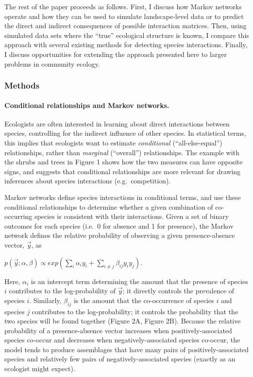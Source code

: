 \documentclass[12pt,]{article}
\begin{document}
\begin{spacing}{1.9}
\begin{flushleft}
The rest of the paper proceeds as follows. First, I discuss how Markov
networks operate and how they can be used to simulate landscape-level
data or to predict the direct and indirect consequences of possible
interaction matrices. Then, using simulated data sets where the ``true''
ecological structure is known, I compare this approach with several
existing methods for detecting species interactions. Finally, I discuss
opportunities for extending the approach presented here to larger
problems in community ecology.

\subsubsection{Methods}\label{methods}

\paragraph{Conditional relationships and Markov
networks.}\label{conditional-relationships-and-markov-networks.}

Ecologists are often interested in learning about direct interactions
between species, controlling for the indirect influence of other
species. In statistical terms, this implies that ecologists want to
estimate \emph{conditional} (``all-else-equal'') relationships, rather
than \emph{marginal} (``overall'') relationships. The example with the
shrubs and trees in Figure 1 shows how the two measures can have
opposite signs, and suggests that conditional relationships are more
relevant for drawing inferences about species interactions
(e.g.~competition).

Markov networks define species interactions in conditional terms, and
use these conditional relationships to determine whether a given
combination of co-occurring species is consistent with their
interactions. Given a set of binary outcomes for each species (i.e.~0
for absence and 1 for presence), the Markov network defines the relative
probability of observing a given presence-absence vector, \(\vec{y}\),
as

\centering
\(p(\vec{y}; \alpha, \beta) \propto exp(\sum_{i}\alpha_i y_i + \sum_{i\neq j}\beta_{ij}y_i y_j).\)
\raggedright

Here, \(\alpha_{i}\) is an intercept term determining the amount that
the presence of species \(i\) contributes to the log-probability of
\(\vec{y}\); it directly controls the prevalence of species \(i\).
Similarly, \(\beta_{ij}\) is the amount that the co-occurrence of
species \(i\) and species \(j\) contributes to the log-probability; it
controls the probability that the two species will be found together
(Figure 2A, Figure 2B). Because the relative probability of a
presence-absence vector increases when positively-associated species
co-occur and decreases when negatively-associated species co-occur, the
model tends to produce assemblages that have many pairs of
positively-associated species and relatively few pairs of
negatively-associated species (exactly as an ecologist might expect).


\end{flushleft}
\end{spacing}
\end{document}
